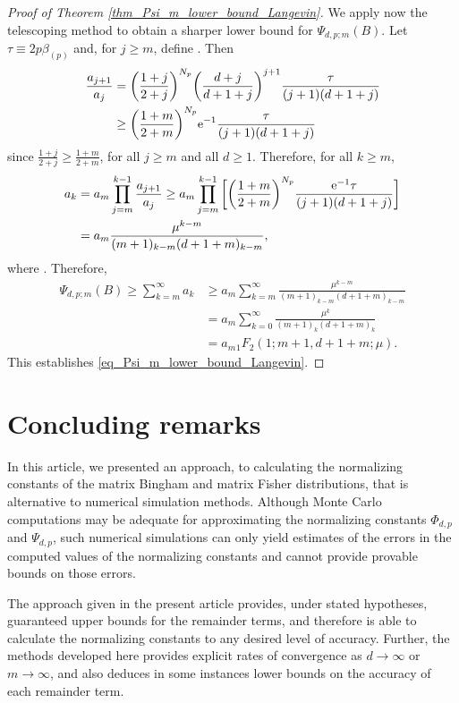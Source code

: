\documentclass[pdftex]{sigma}
\numberwithin{equation}{section}
\begin{document}
\begin{proof}[Proof of Theorem \ref{thm_Psi_m_lower_bound_Langevin}]
We apply now the telescoping method to obtain a sharper lower bound for $\Psi_{d,p;m}(B)$. Let~${\tau \equiv 2p\beta_{(p)}}$ and, for $j \ge m$, define
.
Then
\begin{align*}
\frac{a_{j+1}}{a_j} &= \bigg(\frac{1+j}{2+j}\bigg)^{N_p} \bigg(\frac{d+j}{d+1+j}\bigg)^{j+1} \frac{\tau}{(j+1)(d+1+j)} \\
&\ge \bigg(\frac{1+m}{2+m}\bigg)^{N_p} {\rm e}^{-1} \frac{\tau}{(j+1)(d+1+j)}
\end{align*}
since
$
\frac{1+j}{2+j} \ge \frac{1+m}{2+m}$, 
for all $j \ge m$ and all $d \ge 1$. Therefore, for all $k \ge m$,
\begin{align*}
a_k &= a_m \prod_{j=m}^{k-1} \frac{a_{j+1}}{a_j}
\ge a_m \prod_{j=m}^{k-1} \bigg[\bigg(\frac{1+m}{2+m}\bigg)^{N_p} \frac{{\rm e}^{-1} \tau}{(j+1)(d+1+j)}\bigg] \\
&= a_m \frac{\mu^{k-m}}{(m+1)_{k-m} (d+1+m)_{k-m}},
\end{align*}
where
.
Therefore, \begin{align*}
\Psi_{d,p;m}(B) \ge \sum_{k=m}^\infty a_k &\ge a_m \sum_{k=m}^\infty \frac{\mu^{k-m}}{(m+1)_{k-m} (d+1+m)_{k-m}} \\
&= a_m \sum_{k=0}^\infty \frac{\mu^k}{(m+1)_k (d+1+m)_k} \\
&= a_m {}_1F_2(1;m+1,d+1+m;\mu).
\end{align*}
This establishes \eqref{eq_Psi_m_lower_bound_Langevin}.
\end{proof}

\section{Concluding remarks}
\label{sec_conclusions}

In this article, we presented an approach, to calculating the normalizing constants of the matrix Bingham and matrix Fisher distributions, that is alternative to numerical simulation methods. Although Monte Carlo computations may be adequate for approximating the normalizing constants $\Phi_{d,p}$ and $\Psi_{d,p}$, such numerical simulations can only yield estimates of the errors in the computed values of the normalizing constants and cannot provide provable bounds on those errors.

The approach given in the present article provides, under stated hypotheses, guaranteed upper bounds for the remainder terms, and therefore is able to calculate the normalizing constants to any desired level of accuracy. Further, the methods developed here provides explicit rates of convergence as $d \to \infty$ or $m \to \infty$, and also deduces in some instances lower bounds on the accuracy of each remainder term.
\end{document}
